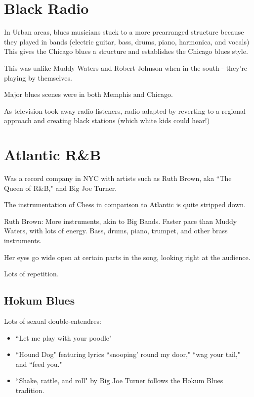 \documentclass[12pt, a4paper, twoside, openright, titlepage]{book}
\begin{document}
\section{Black Radio}

\begin{note}{}{}
    In Urban areas, blues musicians stuck to a more prearranged structure because they played in bands (electric guitar, bass, drums, piano, harmonica, and vocals) This gives the Chicago blues a structure and establishes the Chicago blues style.
\end{note}

This was unlike Muddy Waters and Robert Johnson when in the south - they're playing by themselves.

\begin{rmk}{}{}
    Major blues scenes were in both Memphis and Chicago.
\end{rmk}

As television took away radio listeners, radio adapted by reverting to a regional approach and creating black stations (which white kids could hear!)

\section{Atlantic R\&B}


Was a record company in NYC with artists such as Ruth Brown, aka ``The Queen of R\&B," and Big Joe Turner.

\begin{note}{}{}
    The instrumentation of Chess in comparison to Atlantic is quite stripped down.
\end{note}


\begin{eg}{}{}
    Ruth Brown: More instruments, akin to Big Bands. Faster pace than Muddy Waters, with lots of energy. Bass, drums, piano, trumpet, and other brass instruments. 

    Her eyes go wide open at certain parts in the song, looking right at the audience.

    Lots of repetition.
\end{eg}

\subsection{Hokum Blues}

Lots of sexual double-entendres: 
\begin{eg}{}{}
    \leavevmode
    \begin{itemize}
        \item ``Let me play with your poodle"
        \item ``Hound Dog" featuring lyrics ``snooping' round my door," ``wag your tail," and ``feed you."
        \item ``Shake, rattle, and roll" by Big Joe Turner follows the Hokum Blues tradition.
    \end{itemize}
\end{eg}
\end{document}
